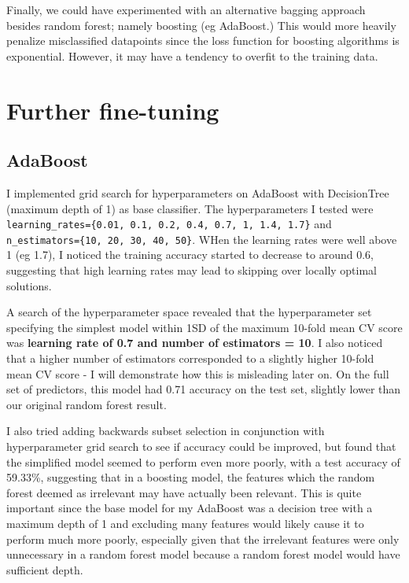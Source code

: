 \documentclass[12pt]{article}
\begin{document}
Finally, we could have experimented with an alternative bagging approach besides random forest; namely boosting (eg AdaBoost.) This would more heavily penalize misclassified datapoints since the loss function for boosting algorithms is exponential. However, it may have a tendency to overfit to the training data.

\section{Further fine-tuning}

\subsection{AdaBoost}

I implemented grid search for hyperparameters on AdaBoost with DecisionTree (maximum depth of 1) as base classifier. The hyperparameters I tested were \texttt{learning\_rates=\{0.01, 0.1, 0.2, 0.4, 0.7, 1, 1.4, 1.7\}} and \texttt{n\_estimators=\{10, 20, 30, 40, 50\}}. WHen the learning rates were well above 1 (eg 1.7), I noticed the training accuracy started to decrease to around 0.6, suggesting that high learning rates may lead to skipping over locally optimal solutions.\newline

 A search of the hyperparameter space revealed that the hyperparameter set specifying the simplest model within 1SD of the maximum 10-fold mean CV score was \textbf{learning rate of 0.7 and number of estimators = 10}. I also noticed that a higher number of estimators corresponded to a slightly higher 10-fold mean CV score - I will demonstrate how this is misleading later on. On the full set of predictors, this model had 0.71 accuracy on the test set, slightly lower than our original random forest result.\newline

I also tried adding backwards subset selection in conjunction with hyperparameter grid search to see if accuracy could be improved, but found that the simplified model seemed to perform even more poorly, with a test accuracy of 59.33\%, suggesting that in a boosting model, the features which the random forest deemed as irrelevant may have actually been relevant. This is quite important since the base model for my AdaBoost was a decision tree with a maximum depth of 1 and excluding many features would likely cause it to perform much more poorly, especially given that the irrelevant features were only unnecessary in a random forest model because a random forest model would have sufficient depth.\newline
\end{document}
